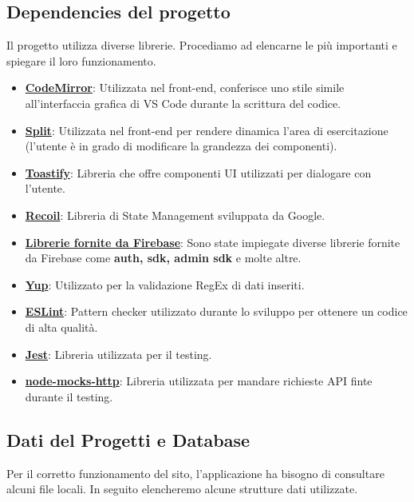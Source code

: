 \documentclass[11pt, a4paper]{article}
\theoremstyle{definition}
\begin{document}
\subsection{Dependencies del progetto}
Il progetto utilizza diverse librerie. Procediamo ad elencarne le più importanti e spiegare il loro funzionamento.
\begin{itemize}
  \item \href{https://codemirror.net/}{\textbf{CodeMirror}}: Utilizzata nel front-end, conferisce uno stile simile all'interfaccia grafica di VS Code durante la scrittura del codice.
  \item \href{https://split.js.org/}{\textbf{Split}}: Utilizzata nel front-end per rendere dinamica l'area di esercitazione (l'utente è in grado di modificare la grandezza dei componenti).
  \item \href{https://www.npmjs.com/package/react-toastify}{\textbf{Toastify}}: Libreria che offre componenti UI utilizzati per dialogare con l'utente.
  \item \href{https://recoiljs.org/}{\textbf{Recoil}}: Libreria di State Management sviluppata da Google.
  \item \href{https://firebase.google.com/docs/build}{\textbf{Librerie fornite da Firebase}}: Sono state impiegate diverse librerie fornite da Firebase come \textbf{auth, sdk, admin sdk} e molte altre.
  \item \href{https://www.npmjs.com/package/yup}{\textbf{Yup}}: Utilizzato per la validazione RegEx di dati inseriti.
  \item \href{https://eslint.org/}{\textbf{ESLint}}: Pattern checker utilizzato durante lo sviluppo per ottenere un codice di alta qualità.
  \item \href{https://jestjs.io/}{\textbf{Jest}}: Libreria utilizzata per il testing.
  \item \href{https://www.npmjs.com/package/node-mocks-http}{\textbf{node-mocks-http}}: Libreria utilizzata per mandare richieste API finte durante il testing.
\end{itemize}

\newpage
\subsection{Dati del Progetti e Database}
Per il corretto funzionamento del sito, l'applicazione ha bisogno di consultare alcuni file locali. In seguito elencheremo alcune strutture dati utilizzate.
\end{document}

